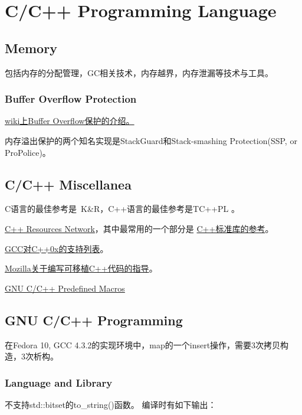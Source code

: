 \part{C/C++ Programming Language} 
 \label{language-c-cpp}

\chapter{Memory}
包括内存的分配管理，GC相关技术，内存越界，内存泄漏等技术与工具。
\section{Buffer Overflow Protection}\label{cpp-buffer-overflow-protection}
\noindent\href{http://en.wikipedia.org/wiki/Buffer_overflow_protection}{wiki上Buffer Overflow保护的介绍。}

内存溢出保护的两个知名实现是StackGuard和Stack-smashing Protection(SSP, or ProPolice)。

\chapter{C/C++ Miscellanea}
\noindent C语言的最佳参考是~K\&R，C++语言的最佳参考是TC++PL \cite{tcpl}。 \par
\noindent\href{http://www.cplusplus.com/}{C++ Resources Network}，其中最常用的一个部分是
\href{http://www.cplusplus.com/reference/}{C++标准库的参考}。\par
\noindent\href{http://gcc.gnu.org/projects/cxx0x.html}{GCC对C++0x的支持列表}。 \par
\noindent\href{https://developer.mozilla.org/En/C\_\_\_Portability\_Guide}{Mozilla关于编写可移植C++代码的指导}。\par
\noindent\href{http://gcc.gnu.org/onlinedocs/cpp/Predefined-Macros.html}{GNU C/C++ Predefined Macros}

\chapter{GNU C/C++ Programming}
在Fedora 10, GCC 4.3.2的实现环境中，map的一个insert操作，需要3次拷贝构造，3次析构。

\section{Language and Library}

不支持std::bitset的to\_string()函数。
编译时有如下输出：

